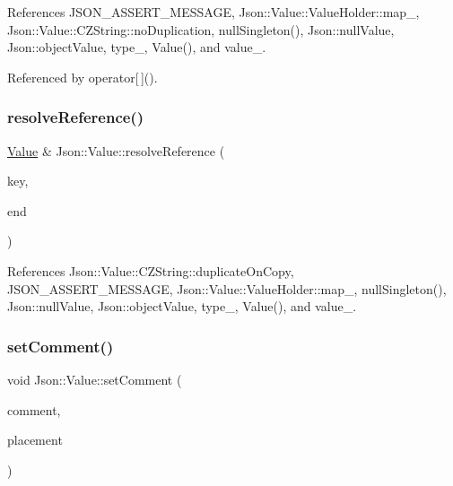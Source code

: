 References J\+S\+O\+N\+\_\+\+A\+S\+S\+E\+R\+T\+\_\+\+M\+E\+S\+S\+A\+GE, Json\+::\+Value\+::\+Value\+Holder\+::map\+\_\+, Json\+::\+Value\+::\+C\+Z\+String\+::no\+Duplication, null\+Singleton(), Json\+::null\+Value, Json\+::object\+Value, type\+\_\+, Value(), and value\+\_\+.



Referenced by operator\mbox{[}$\,$\mbox{]}().

\mbox{\label{classJson_1_1Value_a5f6b3aaf4f2e952a33dd823db008c333_a5f6b3aaf4f2e952a33dd823db008c333}} 
\subsubsection{\texorpdfstring{resolve\+Reference()}{resolveReference()}\hspace{0.1cm}{\footnotesize\ttfamily [2/2]}}
{\footnotesize\ttfamily \hyperlink{classJson_1_1Value}{Value} \& Json\+::\+Value\+::resolve\+Reference (\begin{DoxyParamCaption}\item[{const char $\ast$}]{key,  }\item[{const char $\ast$}]{end }\end{DoxyParamCaption})\hspace{0.3cm}{\ttfamily [private]}}



References Json\+::\+Value\+::\+C\+Z\+String\+::duplicate\+On\+Copy, J\+S\+O\+N\+\_\+\+A\+S\+S\+E\+R\+T\+\_\+\+M\+E\+S\+S\+A\+GE, Json\+::\+Value\+::\+Value\+Holder\+::map\+\_\+, null\+Singleton(), Json\+::null\+Value, Json\+::object\+Value, type\+\_\+, Value(), and value\+\_\+.

\mbox{\label{classJson_1_1Value_a29f3a30f7e5d3af6f38d57999bf5b480_a29f3a30f7e5d3af6f38d57999bf5b480}} 
\subsubsection{\texorpdfstring{set\+Comment()}{setComment()}\hspace{0.1cm}{\footnotesize\ttfamily [1/3]}}
{\footnotesize\ttfamily void Json\+::\+Value\+::set\+Comment (\begin{DoxyParamCaption}\item[{const char $\ast$}]{comment,  }\item[{\hyperlink{namespaceJson_a4fc417c23905b2ae9e2c47d197a45351_a4fc417c23905b2ae9e2c47d197a45351}{Comment\+Placement}}]{placement }\end{DoxyParamCaption})}

